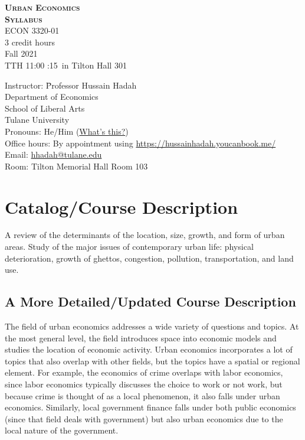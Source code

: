 \documentclass[11pt,letterpaper,final]{article}
\begin{document}
 \singlespacing

\begin{center}
	{\bf\scshape\LARGE Urban Economics \\Syllabus\\} \normalsize
ECON 3320-01 \\ 
3 credit hours \\
Fall 2021\\
TTH 11:00 :15\PM\ in Tilton Hall 301
\end{center}


\begin{tabbing}
	Instructor: \hspace{0.5cm} \= Professor Hussain Hadah \\ \kill 
	\> Department of Economics\\
	\> School of Liberal Arts \\
	\> Tulane University\\
		Pronouns: \> He/Him (\href{https://www.mypronouns.org/}{What's this?}) \\
	Office hours: \> By appointment using \href{https://hussainhadah.youcanbook.me/}{https://hussainhadah.youcanbook.me/} \\
	Email: \> \href{mailto:hhadah@tulane.edu}{hhadah@tulane.edu}\\
		Room: \> Tilton Memorial Hall Room 103\\
\end{tabbing}

\begin{multicols}{2}
  \tableofcontents
\end{multicols}

\newpage

\section{Catalog/Course Description}
A review of the determinants of the location, size, growth, and form of urban areas. Study of the major issues of contemporary urban life: physical deterioration, growth of ghettos, congestion, pollution, transportation, and land use.

\subsection{A More Detailed/Updated Course Description}
The field of urban economics addresses a wide variety of questions and topics. At the most general level, the field introduces space into economic models and studies the location of economic activity. Urban economics incorporates a lot of topics that also overlap with other fields, but the topics have a spatial or regional element. For example, the economics of crime overlaps with labor economics, since labor economics typically discusses the choice to work or not work, but because crime is thought of as a local phenomenon, it also falls under urban economics. Similarly, local government finance falls under both public economics (since that field deals with government) but also urban economics due to the local nature of the government. 
\end{document}
